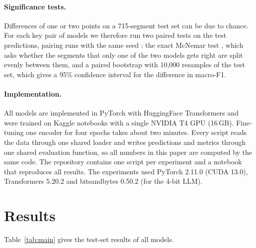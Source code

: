 \paragraph{Significance tests.} Differences of one or two points on a 715-segment test set can be
due to chance. For each key pair of models we therefore run two paired tests on the test
predictions, pairing runs with the same seed \cite{dror2018hitchhiker}: the exact McNemar test
\cite{mcnemar1947note}, which asks whether the segments that only one of the two models gets right
are split evenly between them, and a paired bootstrap \cite{berg2012empirical} with 10,000
resamples of the test set, which gives a 95\% confidence interval for the difference in macro-F1.

\paragraph{Implementation.} All models are implemented in PyTorch with HuggingFace Transformers and
were trained on Kaggle notebooks with a single NVIDIA T4 GPU (16\,GB). Fine-tuning one encoder for four
epochs takes about two minutes. Every script reads the data through one shared loader and writes predictions and
metrics through one shared evaluation function, so all numbers in this paper are computed by the
same code. The repository contains one script per experiment and a notebook that reproduces all
results. The experiments used PyTorch 2.11.0 (CUDA 13.0), Transformers 5.20.2 and bitsandbytes 0.50.2
(for the 4-bit LLM).

\section{Results}
\label{sec:results}

Table~\ref{tab:main} gives the test-set results of all models.

